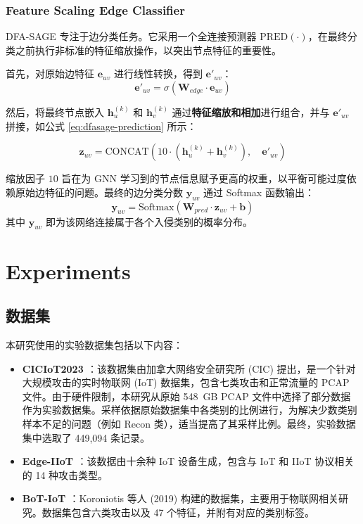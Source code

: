 \documentclass{article}
\begin{document}
\subsubsection{Feature Scaling Edge Classifier}

DFA-SAGE 专注于边分类任务。它采用一个全连接预测器 $\text{PRED}(\cdot)$，在最终分类之前执行非标准的特征缩放操作，以突出节点特征的重要性。

首先，对原始边特征 $\mathbf{e}_{uv}$ 进行线性转换，得到 $\mathbf{e}'_{uv}$：
\begin{equation}
\mathbf{e}'_{uv} = \sigma(\mathbf{W}_{edge} \cdot \mathbf{e}_{uv})
\end{equation}

然后，将最终节点嵌入 $\mathbf{h}_u^{(k)}$ 和 $\mathbf{h}_v^{(k)}$ 通过\textbf{特征缩放和相加}进行组合，并与 $\mathbf{e}'_{uv}$ 拼接，如公式 \eqref{eq:dfasage-prediction} 所示：

\begin{equation}
\mathbf{z}_{uv} = \text{CONCAT} \left( 10 \cdot (\mathbf{h}_u^{(k)} + \mathbf{h}_v^{(k)}), \quad \mathbf{e}'_{uv} \right)
\label{eq:dfasage-prediction}
\end{equation}

缩放因子 $10$ 旨在为 GNN 学习到的节点信息赋予更高的权重，以平衡可能过度依赖原始边特征的问题。最终的边分类分数 $\mathbf{y}_{uv}$ 通过 Softmax 函数输出：
$$
\mathbf{y}_{uv} = \text{Softmax} \left( \mathbf{W}_{pred} \cdot \mathbf{z}_{uv} + \mathbf{b} \right)
$$
其中 $\mathbf{y}_{uv}$ 即为该网络连接属于各个入侵类别的概率分布。

\section{Experiments}

\subsection{数据集}

本研究使用的实验数据集包括以下内容：

\begin{itemize}
    \item \textbf{CICIoT2023 \cite{202305.0443}}：该数据集由加拿大网络安全研究所 (CIC) 提出，是一个针对大规模攻击的实时物联网 (IoT) 数据集，包含七类攻击和正常流量的 PCAP 文件。由于硬件限制，本研究从原始 548~GB PCAP 文件中选择了部分数据作为实验数据集。采样依据原始数据集中各类别的比例进行，为解决少数类别样本不足的问题（例如 Recon 类），适当提高了其采样比例。最终，实验数据集中选取了 449,094 条记录。

    \item \textbf{Edge-IIoT \cite{9751703}}：该数据由十余种 IoT 设备生成，包含与 IoT 和 IIoT 协议相关的 14 种攻击类型。

    \item \textbf{BoT-IoT \cite{KORONIOTIS2019779}}：Koroniotis 等人 (2019) 构建的数据集，主要用于物联网相关研究。数据集包含六类攻击以及 47 个特征，并附有对应的类别标签。
\end{itemize}
\end{document}
